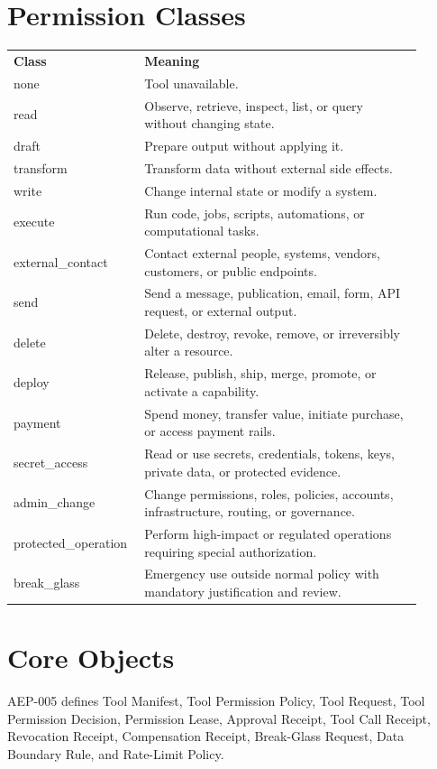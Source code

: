 \documentclass[11pt]{article}
\begin{document}
\section{Permission Classes}
\begin{longtable}{p{0.25\linewidth}p{0.65\linewidth}}
\textbf{Class} & \textbf{Meaning}\\
none & Tool unavailable.\\
read & Observe, retrieve, inspect, list, or query without changing state.\\
draft & Prepare output without applying it.\\
transform & Transform data without external side effects.\\
write & Change internal state or modify a system.\\
execute & Run code, jobs, scripts, automations, or computational tasks.\\
external\_contact & Contact external people, systems, vendors, customers, or public endpoints.\\
send & Send a message, publication, email, form, API request, or external output.\\
delete & Delete, destroy, revoke, remove, or irreversibly alter a resource.\\
deploy & Release, publish, ship, merge, promote, or activate a capability.\\
payment & Spend money, transfer value, initiate purchase, or access payment rails.\\
secret\_access & Read or use secrets, credentials, tokens, keys, private data, or protected evidence.\\
admin\_change & Change permissions, roles, policies, accounts, infrastructure, routing, or governance.\\
protected\_operation & Perform high-impact or regulated operations requiring special authorization.\\
break\_glass & Emergency use outside normal policy with mandatory justification and review.\\
\end{longtable}

\section{Core Objects}
AEP-005 defines Tool Manifest, Tool Permission Policy, Tool Request, Tool Permission Decision, Permission Lease, Approval Receipt, Tool Call Receipt, Revocation Receipt, Compensation Receipt, Break-Glass Request, Data Boundary Rule, and Rate-Limit Policy.
\end{document}
